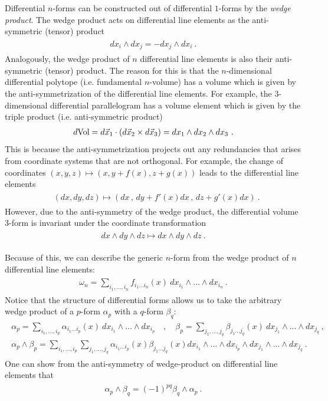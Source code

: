 \documentclass[11pt]{article}
\newcommand{\eq}[1]{\begin{align}\begin{split}#1\end{split}\end{align}}
\begin{document}
  
Differential $n$-forms can be constructed out of differential $1$-forms by the \emph{wedge product}.
The wedge product acts on differential line elements as the anti-symmetric (tensor) product 
\eq{
dx_i\wedge dx_j=-dx_j\wedge dx_i~.
}
Analogously, the wedge product of $n$ differential line elements is also their anti-symmetric (tensor) product. The reason for this is that the $n$-dimensional differential polytope (i.e. fundamental $n$-volume) has a volume which is given by the anti-symmetrization of the differential line elements. For example, the 3-dimensional differential parallelogram has a volume element which is given by the triple product (i.e. anti-symmetric product) 
\eq{
d{\rm Vol}=d\vec{x}_1\cdot(d\vec{x}_2\times d\vec{x}_3)=dx_1\wedge dx_2\wedge dx_3~.
}
 This is because the anti-symmetrization projects out any  redundancies that arises from coordinate systems that are not orthogonal. For example, the change of coordinates $(x,y,z)\mapsto (x,y+f(x),z+g(x))$ leads to the differential line elements 
\eq{
&(dx,dy,dz)\longmapsto (dx\,,\,dy+f'(x)dx\,,\,dz+g'(x)dx)~.
}
However, due to the anti-symmetry of the wedge product, the differential volume 3-form is invariant under the coordinate transformation
\eq{
dx\wedge dy\wedge dz\longmapsto dx\wedge dy\wedge dz~.
}

Because of this, we can describe the generic $n$-form from the wedge product of $n$ differential line elements:
\eq{\label{nform}
\omega_n=\sum_{i_1,...,i_n}f_{i_1...i_n}(x)~dx_{i_1}\wedge ...\wedge dx_{i_n}~.
}
Notice that the structure of differential forms allows us to take the arbitrary wedge product of a $p$-form $\alpha_p$ with a $q$-form $\beta_q$:
\eq{
\alpha_p=\sum_{i_1,...,i_p}\alpha_{i_1...i_p}(x)~dx_{i_1}\wedge...\wedge dx_{i_p}\quad, \quad \beta_p=\sum_{j_1,...,j_q}\beta_{j_1...j_q}(x)~dx_{j_1}\wedge...\wedge dx_{j_q}~,\\
\alpha_p\wedge \beta_p=\sum_{i_1,...,i_p}\sum_{j_1,...,j_q}\alpha_{i_1...i_p}(x)\beta_{j_1...j_q}(x)dx_{i_1}\wedge...\wedge dx_{i_p}\wedge dx_{j_1}\wedge...\wedge dx_{j_q}~.
}
One can show from the anti-symmetry of wedge-product on differential line elements that 
\eq{
\alpha_p\wedge \beta_q=(-1)^{pq}\beta_q\wedge \alpha_p~. 
}
\end{document}
